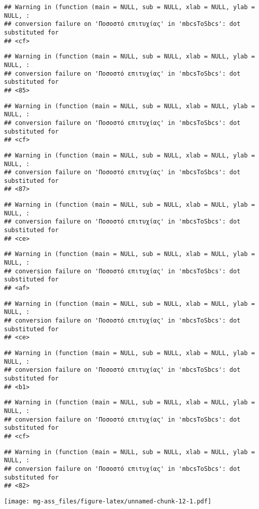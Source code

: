 \documentclass[
]{article}
\begin{document}
\begin{verbatim}
## Warning in (function (main = NULL, sub = NULL, xlab = NULL, ylab = NULL, :
## conversion failure on 'Ποσοστό επιτυχίας' in 'mbcsToSbcs': dot substituted for
## <cf>
\end{verbatim}

\begin{verbatim}
## Warning in (function (main = NULL, sub = NULL, xlab = NULL, ylab = NULL, :
## conversion failure on 'Ποσοστό επιτυχίας' in 'mbcsToSbcs': dot substituted for
## <85>
\end{verbatim}

\begin{verbatim}
## Warning in (function (main = NULL, sub = NULL, xlab = NULL, ylab = NULL, :
## conversion failure on 'Ποσοστό επιτυχίας' in 'mbcsToSbcs': dot substituted for
## <cf>
\end{verbatim}

\begin{verbatim}
## Warning in (function (main = NULL, sub = NULL, xlab = NULL, ylab = NULL, :
## conversion failure on 'Ποσοστό επιτυχίας' in 'mbcsToSbcs': dot substituted for
## <87>
\end{verbatim}

\begin{verbatim}
## Warning in (function (main = NULL, sub = NULL, xlab = NULL, ylab = NULL, :
## conversion failure on 'Ποσοστό επιτυχίας' in 'mbcsToSbcs': dot substituted for
## <ce>
\end{verbatim}

\begin{verbatim}
## Warning in (function (main = NULL, sub = NULL, xlab = NULL, ylab = NULL, :
## conversion failure on 'Ποσοστό επιτυχίας' in 'mbcsToSbcs': dot substituted for
## <af>
\end{verbatim}

\begin{verbatim}
## Warning in (function (main = NULL, sub = NULL, xlab = NULL, ylab = NULL, :
## conversion failure on 'Ποσοστό επιτυχίας' in 'mbcsToSbcs': dot substituted for
## <ce>
\end{verbatim}

\begin{verbatim}
## Warning in (function (main = NULL, sub = NULL, xlab = NULL, ylab = NULL, :
## conversion failure on 'Ποσοστό επιτυχίας' in 'mbcsToSbcs': dot substituted for
## <b1>
\end{verbatim}

\begin{verbatim}
## Warning in (function (main = NULL, sub = NULL, xlab = NULL, ylab = NULL, :
## conversion failure on 'Ποσοστό επιτυχίας' in 'mbcsToSbcs': dot substituted for
## <cf>
\end{verbatim}

\begin{verbatim}
## Warning in (function (main = NULL, sub = NULL, xlab = NULL, ylab = NULL, :
## conversion failure on 'Ποσοστό επιτυχίας' in 'mbcsToSbcs': dot substituted for
## <82>
\end{verbatim}

\texttt{[image: mg-ass\_files/figure-latex/unnamed-chunk-12-1.pdf]}
\end{document}
